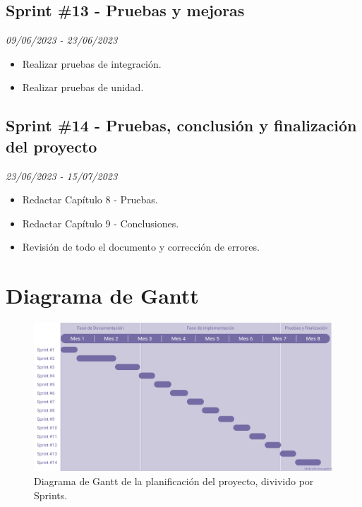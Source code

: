 \subsection{Sprint \#13 - Pruebas y mejoras}
\textit{09/06/2023   -   23/06/2023}
\begin{itemize}
    \item Realizar pruebas de integración.
    \item Realizar pruebas de unidad.
    \end{itemize}

\subsection{Sprint \#14 - Pruebas, conclusión y finalización del proyecto}
\textit{23/06/2023   -   15/07/2023}
\begin{itemize}

    \item Redactar Capítulo 8 - Pruebas.
    \item Redactar Capítulo 9 - Conclusiones.
    \item Revisión de todo el documento y corrección de errores.
\end{itemize}



\section{Diagrama de Gantt}


\begin{figure}[H]

    \centering
    \centerline{\includegraphics[width=1.25\textwidth]{imagenes/c4/gantt.png}}
    \caption{Diagrama de Gantt de la planificación del proyecto, divivido por Sprints.}
    \label{fig:artly}
    
    
\end{figure}
